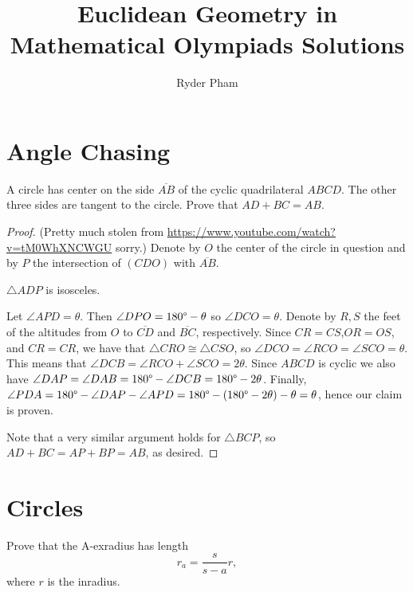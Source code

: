 \documentclass[letterpaper,oneside]{scrartcl}
\providecommand{\ol}{\overline}
\begin{document}
\title{Euclidean Geometry in Mathematical Olympiads Solutions}
\author{Ryder Pham}
\maketitle

\section{Angle Chasing}
\begin{problem*}
  [1.51, IMO 1985/1]
  A circle has center on the side $\ol{AB}$ of the cyclic quadrilateral $ABCD$. The other three sides are tangent to the circle. Prove that $AD + BC = AB$.
\end{problem*}

\begin{proof}
  (Pretty much stolen from \url{https://www.youtube.com/watch?v=tM0WhXNCWGU} sorry.)
  Denote by \(O\) the center of the circle in question and by \(P\) the intersection of \((CDO)\) with \(\ol{AB}\).
  \begin{claim*}
    \(\triangle ADP\) is isosceles.
  \end{claim*}
  \begin{subproof}
    Let \(\angle APD = \theta\). Then \(\angle DPO = 180\degree - \theta\) so \(\angle DCO = \theta\). Denote by \(R,S\) the feet of the altitudes from \(O\) to \(\ol{CD}\) and \(\ol{BC}\), respectively. Since \(CR = CS\),\(OR = OS\), and \(CR = CR\), we have that \(\triangle CRO \cong \triangle CSO\), so \(\angle DCO = \angle RCO = \angle SCO = \theta\). This means that \(\angle DCB = \angle RCO + \angle SCO = 2\theta\). Since \(ABCD\) is cyclic we also have \(\angle DAP = \angle DAB = 180\degree - \angle DCB = 180\degree - 2\theta\). Finally, \(\angle PDA = 180\degree - \angle DAP - \angle APD = 180\degree - (180\degree - 2\theta) - \theta = \theta\), hence our claim is proven.
  \end{subproof}
  Note that a very similar argument holds for \(\triangle BCP\), so \(AD+BC = AP + BP = AB\), as desired.
\end{proof}
\newpage
\section{Circles}

\begin{lemma*}
  [2.19]
  Prove that the A-exradius has length
  $$r_a = \frac{s}{s-a}r,$$
  where $r$ is the inradius.
\end{lemma*}
\end{document}
